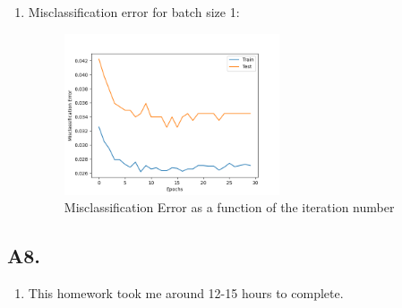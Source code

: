 \documentclass[12pt]{article}
\theoremstyle{definitionstyle}
\begin{document}
\begin{enumerate}[label=\alph*.]
\begin{enumerate}[label=(\roman*)]
            \item Misclassification error for batch size 1:
            \begin{figure}[H]
                \centering
                \includegraphics[width=0.6\textwidth]{batch_size_1_missclass.png}
                \caption{Misclassification Error as a function of the iteration number}
            \end{figure}
        \end{enumerate}
    \end{enumerate}

    \subsection*{A8.}
    \begin{enumerate}
        \item This homework took me around 12-15 hours to complete.
    \end{enumerate}
\end{document}
